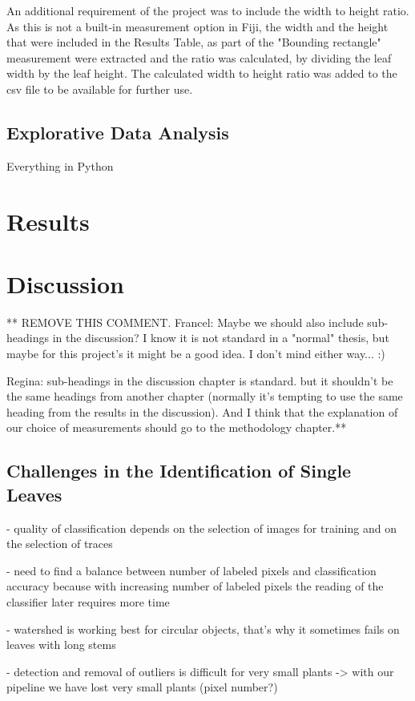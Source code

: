\documentclass[paper=A4,bibliography=totocnumbered]{scrartcl}
\begin{document}
An additional requirement of the project was to include the width to height ratio. As this is not a built-in measurement option in Fiji, the width and the height that were included in the Results Table, as part of the "Bounding rectangle" measurement were extracted and the ratio was calculated, by dividing the leaf width by the leaf height. The calculated width to height ratio was added to the csv file to be available for further use. 

\subsection{Explorative Data Analysis}
Everything in Python

\section{Results}


\section{Discussion}

** REMOVE THIS COMMENT. 
Francel: Maybe we should also include sub-headings in the discussion? I know it is not standard in a "normal" thesis, but maybe for this project's it might be a good idea. I don't mind either way... :) 

Regina: sub-headings in the discussion chapter is standard. but it shouldn't be the same headings from another chapter (normally it's tempting to use the same heading from the results in the discussion). And I think that the explanation of our choice of measurements should go to the methodology chapter.**

\subsection{Challenges in the Identification of Single Leaves}
- quality of classification depends on the selection of images for training and on the selection of traces

- need to find a balance between number of labeled pixels and classification accuracy because with increasing number of labeled pixels the reading of the classifier later requires more time

- watershed is working best for circular objects, that's why it sometimes fails on leaves with long stems

- detection and removal of outliers is difficult for very small plants -> with our pipeline we have lost very small plants (pixel number?)
\end{document}

